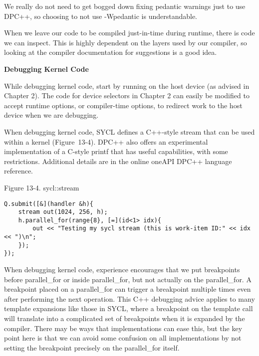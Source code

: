 We really do not need to get bogged down fixing pedantic warnings just to use DPC++, so choosing to not use -Wpedantic is understandable.\par
When we leave our code to be compiled just-in-time during runtime, there is code we can inspect. This is highly dependent on the layers used by our compiler, so looking at the compiler documentation for suggestions is a good idea.\par

\hspace*{\fill} \par %
\textbf{Debugging Kernel Code}

While debugging kernel code, start by running on the host device (as advised in Chapter 2). The code for device selectors in Chapter 2 can easily be modified to accept runtime options, or compiler-time options, to redirect work to the host device when we are debugging.\par

When debugging kernel code, SYCL defines a C++-style stream that can be used within a kernel (Figure 13-4). DPC++ also offers an experimental implementation of a C-style printf that has useful capabilities, with some restrictions. Additional details are in the online oneAPI DPC++ language reference.\par

\hspace*{\fill} \par %
Figure 13-4. sycl::stream
\begin{lstlisting}[caption={}]
Q.submit([&](handler &h){
	stream out(1024, 256, h);
	h.parallel_for(range{8}, [=](id<1> idx){
		out << "Testing my sycl stream (this is work-item ID:" << idx << ")\n";
	});
});
\end{lstlisting}

When debugging kernel code, experience encourages that we put breakpoints before parallel\_for or inside parallel\_for, but not actually on the parallel\_for. A breakpoint placed on a parallel\_for can trigger a breakpoint multiple times even after performing the next operation. This C++ debugging advice applies to many template expansions like those in SYCL, where a breakpoint on the template call will translate into a complicated set of breakpoints when it is expanded by the compiler. There may be ways that implementations can ease this, but the key point here is that we can avoid some confusion on all implementations by not setting the breakpoint precisely on the parallel\_for itself.\par

